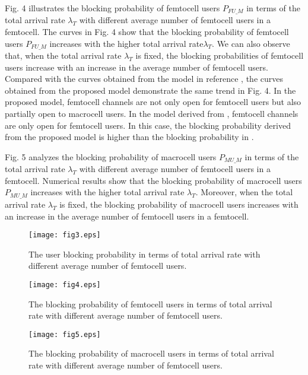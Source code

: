 \documentclass[10pt,final,journal,letterpaper,twoside,twocolumn]{IEEEtran}
\begin{document}
Fig. 4 illustrates the blocking probability of femtocell users  $P_{FU\_M}$ in terms of the total arrival rate ${\lambda _T}$ with different average number of femtocell users in a femtocell. The curves in Fig. 4 show that the blocking probability of femtocell users $P_{FU\_M}$ increases with the higher total arrival rate${\lambda _T}$. We can also observe that, when the total arrival rate ${\lambda _T}$ is fixed, the blocking probabilities of femtocell users increase with an increase in the average number of femtocell users. Compared with the curves obtained from the model in reference \cite{Zhang10}, the curves obtained from the proposed model demonstrate the same trend in Fig. 4. In the proposed model, femtocell channels are not only open for femtocell users but also partially open to macrocell users. In the model derived from \cite{Zhang10}, femtocell channels are only open for femtocell users. In this case, the blocking probability derived from the proposed model is higher than the blocking probability in \cite{Zhang10}.

Fig. 5 analyzes the blocking probability of macrocell users $P_{MU\_M}$ in terms of the total arrival rate $\lambda_T$ with different average number of femtocell users in a femtocell. Numerical results show that the blocking probability of macrocell users $P_{MU\_M}$ increases with the higher total arrival rate $\lambda_T$. Moreover, when the total arrival rate $\lambda_T$ is fixed, the blocking probability of macrocell users increases with an increase in the average number of femtocell users in a femtocell.

\begin{figure}
\vspace{0.1in}
\centerline{\texttt{[image: fig3.eps]}}
\caption{\small The user blocking probability in terms of
total arrival rate with different average number of femtocell users.}
\end{figure}
\begin{figure}
\vspace{0.1in}
\centerline{\texttt{[image: fig4.eps]}}
\caption{\small  The blocking probability of femtocell users in terms of
total arrival rate with different average number of femtocell users.}
\end{figure}
\begin{figure}
\vspace{0.1in}
\centerline{\texttt{[image: fig5.eps]}}
\caption{\small  The blocking probability of macrocell users in terms of
total arrival rate with different average number of femtocell users.}
\end{figure}
\end{document}

